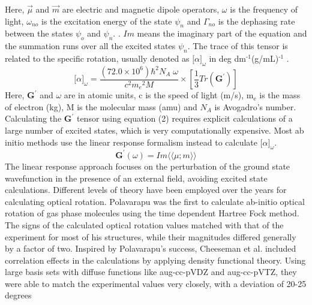 Here, $\vec{\mu}$ and $\vec{m}$ are electric and magnetic dipole operators,
 $\omega$ is the frequency of light, $\omega_{no}$ is the excitation energy of
the state $\psi_n$ and $\Gamma_{no}$ is the dephasing rate between the states
$\psi_o$ and $\psi_n$.
\cite{CrawfordTamJPA07}. $Im$ means the imaginary part of the equation and the
summation runs over all the excited states $\psi_n$. The trace of this tensor
is related to the specific rotation, usually denoted as
${\lbrack\alpha\rbrack}_\omega$ in
deg dm$^{\text{-1}}$(g/mL)$^{\text{-1}}$
\cite{Crawford06}.
\begin{equation}
{\lbrack\alpha\rbrack}_{\omega} = \frac{(72.0 \times 10^6){\hbar}^2 N_A\;\omega}{c^2{m_e}^2 M} \times \left[ \frac{1}{3}Tr(\textbf{G}^\prime)\right]
\end{equation}
Here, $\textbf{G}^\prime$ and $\omega$ are in atomic units, c is the speed of light (m/s), m$_{\text{e}}$ is the mass of
electron (kg), M is the molecular mass (amu) and $N_A$ is Avogadro's
number. Calculating the $\textbf{G}^\prime$ tensor using equation (2) requires explicit calculations of a large
number of excited states, which is very computationally expensive. Most ab initio methods
use the linear response formalism\cite{Koch90,Kobayashi94} instead to calculate
${\lbrack\alpha\rbrack}_\omega$.
\begin{equation}
\textbf{G}^{\prime}(\omega) = Im\langle\langle\mu;m\rangle\rangle
\end{equation} The linear response approach focuses on the perturbation of the
ground state wavefunction in the presence of an external field, avoiding
excited state calculations. Different levels of theory have been employed
over the years for calculating optical rotation. Polavarapu was the first to
calculate ab-initio optical rotation of gas phase molecules using the time
dependent Hartree Fock method\cite{Polavarapu96}. The signs of the calculated optical
rotation values matched with that of the experiment for most of his structures,
while their magnitudes differed generally by a factor of two. Inspired by
Polavarapu's success, Cheeseman et al. \cite{Cheeseman00,Stephens01} included correlation
effects in the calculations by applying density functional theory.
Using large basis sets with diffuse functions like aug-cc-pVDZ and aug-cc-pVTZ,\cite{Dunning89} they were able to match the experimental values very closely, with a deviation of 20-25 degrees
